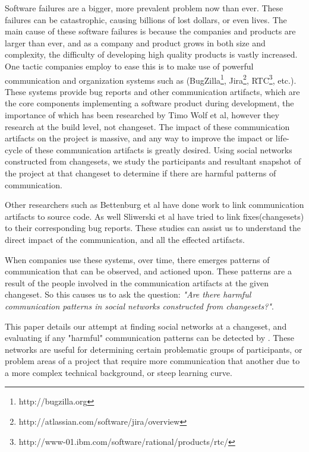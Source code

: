 \documentclass[conference]{IEEEtran}
\begin{document}
Software failures are a bigger, more prevalent problem now than ever.  These failures can be catastrophic, causing billions of lost dollars, or even lives.  The main cause of these software failures is because the companies and products are larger than ever, and as a company and product grows in both size and complexity, the difficulty of developing high quality products is vastly increased.  One tactic companies employ to ease this is to make use of powerful communication and organization systems such as (BugZilla\footnote{http://bugzilla.org}, Jira\footnote{http://atlassian.com/software/jira/overview}, RTC\footnote{http://www-01.ibm.com/software/rational/products/rtc/}, etc.).  These systems provide bug reports and other communication artifacts, which are the core components implementing a software product during development, the importance of which has been researched by Timo Wolf et al\cite{?}, however they research at the build level, not changeset.  The impact of these communication artifacts on the project is massive, and any way to improve the impact or life-cycle of these communication artifacts is greatly desired.  Using social networks constructed from changesets, we study the participants and resultant snapshot of the project at that changeset to determine if there are harmful patterns of communication.  

Other researchers such as Bettenburg et al have done work to link communication artifacts to source code\cite{Bettenburg:2008:ESI:1370750.1370757}.  As well Sliwerski et al have tried to link fixes(changesets) to their corresponding bug reports\cite{Sliwerski:2005:CIF:1083142.1083147}.  These studies can assist us to understand the direct impact of the communication, and all the effected artifacts.

When companies use these systems, over time, there emerges patterns of communication that can be observed, and actioned upon.  These patterns are a result of the people involved in the communication artifacts at the given changeset.   So this causes us to ask the question: \textit{"Are there harmful communication patterns in social networks constructed from changesets?"}.  

This paper details our attempt at finding social networks at a changeset, and evaluating if any "harmful" communication patterns can be detected by  . These networks are useful for determining certain problematic groups of participants, or problem areas of a project that require more communication that another due to a more complex technical background, or steep learning curve. 
\end{document}
